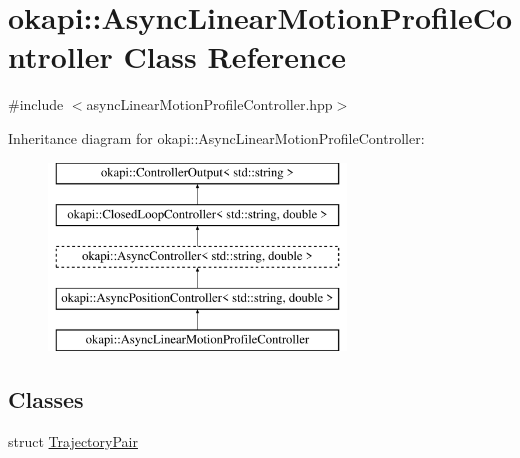 \hypertarget{classokapi_1_1AsyncLinearMotionProfileController}{}\section{okapi\+::Async\+Linear\+Motion\+Profile\+Controller Class Reference}
\label{classokapi_1_1AsyncLinearMotionProfileController}


{\ttfamily \#include $<$async\+Linear\+Motion\+Profile\+Controller.\+hpp$>$}

Inheritance diagram for okapi\+::Async\+Linear\+Motion\+Profile\+Controller\+:\begin{figure}[H]
\begin{center}
\leavevmode
\includegraphics[height=5.000000cm]{classokapi_1_1AsyncLinearMotionProfileController}
\end{center}
\end{figure}
\subsection*{Classes}
\begin{DoxyCompactItemize}
\item 
struct \mbox{\hyperlink{structokapi_1_1AsyncLinearMotionProfileController_1_1TrajectoryPair}{Trajectory\+Pair}}
\end{DoxyCompactItemize}
